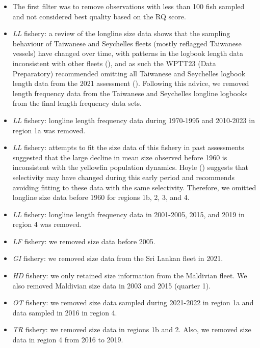 \documentclass[
]{scrartcl}
\begin{document}
\begin{itemize}
\item
  The first filter was to remove observations with less than 100 fish
  sampled and not considered best quality based on the RQ score.
\item
  \emph{LL} fishery: a review of the longline size data shows that the
  sampling behaviour of Taiwanese and Seychelles fleets (mostly
  reflagged Taiwanese vessels) have changed over time, with patterns in
  the logbook length data inconsistent with other fleets
  (), and as such the
  WPTT23 (Data Preparatory) recommended omitting all Taiwanese and
  Seychelles logbook length data from the 2021 assessment
  (). Following
  this advice, we removed length frequency data from the Taiwanese and
  Seychelles longline logbooks from the final length frequency data
  sets.
\item
  \emph{LL} fishery: longline length frequency data during 1970-1995 and
  2010-2023 in region 1a was removed.
\item
  \emph{LL} fishery: attempts to fit the size data of this fishery in
  past assessments suggested that the large decline in mean size
  observed before 1960 is inconsistent with the yellowfin population
  dynamics. Hoyle ()
  suggests that selectivity may have changed during this early period
  and recommends avoiding fitting to these data with the same
  selectivity. Therefore, we omitted longline size data before 1960 for
  regions 1b, 2, 3, and 4.
\item
  \emph{LL} fishery: longline length frequency data in 2001-2005, 2015,
  and 2019 in region 4 was removed.
\item
  \emph{LF} fishery: we removed size data before 2005.
\item
  \emph{GI} fishery: we removed size data from the Sri Lankan fleet in
  2021.
\item
  \emph{HD} fishery: we only retained size information from the
  Maldivian fleet. We also removed Maldivian size data in 2003 and 2015
  (quarter 1).
\item
  \emph{OT} fishery: we removed size data sampled during 2021-2022 in
  region 1a and data sampled in 2016 in region 4.
\item
  \emph{TR} fishery: we removed size data in regions 1b and 2. Also, we
  removed size data in region 4 from 2016 to 2019.
\end{itemize}
\end{document}
